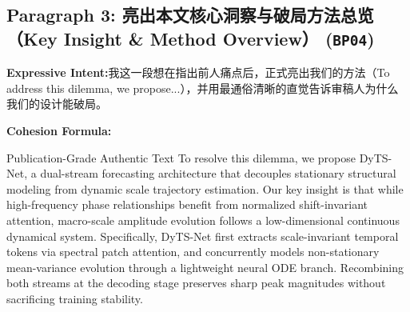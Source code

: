 \subsection*{Paragraph 3: 亮出本文核心洞察与破局方法总览（Key Insight \& Method Overview） (\texttt{BP04})}
\noindent\textbf{Expressive Intent:}\enspace 我这一段想在指出前人痛点后，正式亮出我们的方法（To address this dilemma, we propose...），并用最通俗清晰的直觉告诉审稿人为什么我们的设计能破局。\par
\noindent\textbf{Cohesion Formula:}\par\vspace{4pt}
\begin{ExampleBox}{Publication-Grade Authentic Text}
To resolve this dilemma, we propose DyTS-Net, a dual-stream forecasting architecture that decouples stationary structural modeling from dynamic scale trajectory estimation. Our key insight is that while high-frequency phase relationships benefit from normalized shift-invariant attention, macro-scale amplitude evolution follows a low-dimensional continuous dynamical system. Specifically, DyTS-Net first extracts scale-invariant temporal tokens via spectral patch attention, and concurrently models non-stationary mean-variance evolution through a lightweight neural ODE branch. Recombining both streams at the decoding stage preserves sharp peak magnitudes without sacrificing training stability.
\end{ExampleBox}
